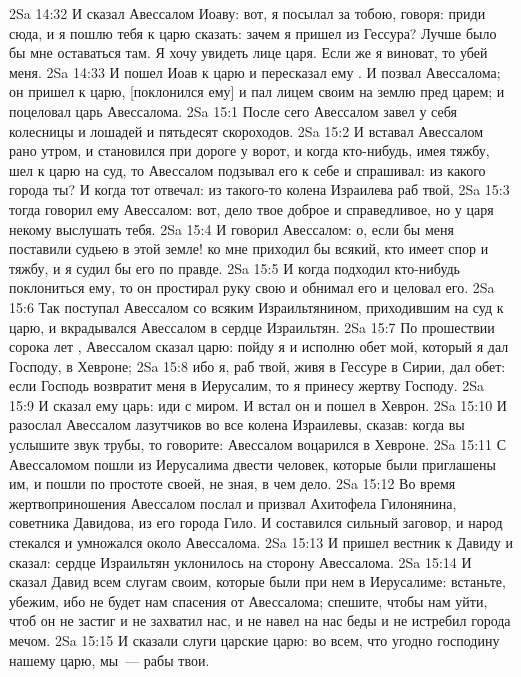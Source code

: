 \vs 2Sa 14:32 И сказал Авессалом Иоаву: вот, я посылал за тобою, говоря: приди сюда, и я пошлю тебя к царю сказать: зачем я пришел из Гессура? Лучше было бы мне оставаться там. Я хочу увидеть лице царя. Если же я виноват, то убей меня.
\vs 2Sa 14:33 И пошел Иоав к царю и пересказал ему . И позвал  Авессалома; он пришел к царю, [поклонился ему] и пал лицем своим на землю пред царем; и поцеловал царь Авессалома.
\vs 2Sa 15:1 После сего Авессалом завел у себя колесницы и лошадей и пятьдесят скороходов.
\vs 2Sa 15:2 И вставал Авессалом рано утром, и становился при дороге у ворот, и когда кто-нибудь, имея тяжбу, шел к царю на суд, то Авессалом подзывал его к себе и спрашивал: из какого города ты? И когда тот отвечал: из такого-то колена Израилева раб твой,
\vs 2Sa 15:3 тогда говорил ему Авессалом: вот, дело твое доброе и справедливое, но у царя некому выслушать тебя.
\vs 2Sa 15:4 И говорил Авессалом: о, если бы меня поставили судьею в этой земле! ко мне приходил бы всякий, кто имеет спор и тяжбу, и я судил бы его по правде.
\vs 2Sa 15:5 И когда подходил кто-нибудь поклониться ему, то он простирал руку свою и обнимал его и целовал его.
\vs 2Sa 15:6 Так поступал Авессалом со всяким Израильтянином, приходившим на суд к царю, и вкрадывался Авессалом в сердце Израильтян.
\rsbpar\vs 2Sa 15:7 По прошествии сорока лет , Авессалом сказал царю: пойду я и исполню обет мой, который я дал Господу, в Хевроне;
\vs 2Sa 15:8 ибо я, раб твой, живя в Гессуре в Сирии, дал обет: если Господь возвратит меня в Иерусалим, то я принесу жертву Господу.
\vs 2Sa 15:9 И сказал ему царь: иди с миром. И встал он и пошел в Хеврон.
\vs 2Sa 15:10 И разослал Авессалом лазутчиков во все колена Израилевы, сказав: когда вы услышите звук трубы, то говорите: Авессалом воцарился в Хевроне.
\vs 2Sa 15:11 С Авессаломом пошли из Иерусалима двести человек, которые были приглашены им, и пошли по простоте своей, не зная, в чем дело.
\vs 2Sa 15:12 Во время жертвоприношения Авессалом послал и призвал Ахитофела Гилонянина, советника Давидова, из его города Гило. И составился сильный заговор, и народ стекался и умножался около Авессалома.
\vs 2Sa 15:13 И пришел вестник к Давиду и сказал: сердце Израильтян уклонилось на сторону Авессалома.
\vs 2Sa 15:14 И сказал Давид всем слугам своим, которые были при нем в Иерусалиме: встаньте, убежим, ибо не будет нам спасения от Авессалома; спешите, чтобы нам уйти, чтоб он не застиг и не захватил нас, и не навел на нас беды и не истребил города мечом.
\vs 2Sa 15:15 И сказали слуги царские царю: во всем, что угодно господину нашему царю, мы~--- рабы твои.
